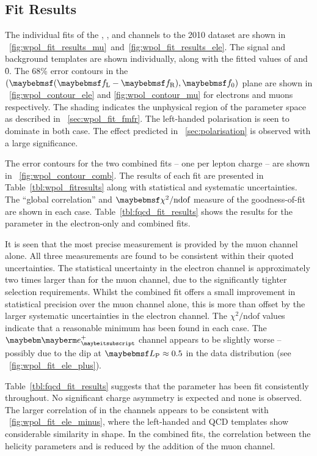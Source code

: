 \subsection{Fit Results}
The individual fits of the \Pgmp, \Pgmm, \Pep and \Pem channels to the 2010
dataset are shown in
\figs~\ref{fig:wpol_fit_results_mu}~and~\ref{fig:wpol_fit_results_ele}. The
signal and background templates are shown individually, along with the fitted
values of \fLmfR and \f0. The 68\% error contours in the $(\fLmfR, \f0)$ plane
are shown in \figs~\ref{fig:wpol_contour_ele} and \ref{fig:wpol_contour_mu} for
electrons and muons respectively. The shading indicates the unphysical region of
the parameter space as described in \sec~\ref{sec:wpol_fit_fmfr}. The
left-handed polarisation is seen to dominate in both case. The effect predicted
in \sec~\ref{sec:polarisation} is observed with a large significance.

The error contours for the two combined fits -- one per lepton charge -- are
shown in \fig~\ref{fig:wpol_contour_comb}. The results of each fit are presented
in Table~\ref{tbl:wpol_fitresults} along with statistical and systematic
uncertainties. The ``global correlation'' and $\chisq/\textrm{ndof}$ measure of
the goodness-of-fit are shown in each case. Table~\ref{tbl:fqcd_fit_results}
shows the results for the parameter \fQCD in the electron-only and combined
fits.

It is seen that the most precise measurement is provided by the muon channel
alone. All three measurements are found to be consistent within their quoted
uncertainties. The statistical uncertainty in the electron channel is
approximately two times larger than for the muon channel, due to the
significantly tighter selection requirements. Whilst the combined fit offers a
small improvement in statistical precision over the muon channel alone, this is
more than offset by the larger systematic uncertainties in the electron
channel. The $\chi^2/\textrm{ndof}$ values indicate that a reasonable minimum
has been found in each case. The $\Pep$ channel appears to be slightly worse --
possibly due to the dip at $\LP \approx 0.5$ in the data distribution (see
\fig~\ref{fig:wpol_fit_ele_plus}).

Table~\ref{tbl:fqcd_fit_results} suggests that the parameter \fQCD has been fit
consistently throughout. No significant charge asymmetry is expected and none is
observed. The larger correlation of \fLmfR in the \PWm channels appears to be
consistent with \fig~\ref{fig:wpol_fit_ele_minus}, where the left-handed and
\ac{QCD} templates show considerable similarity in shape. In the combined fits,
the correlation between the helicity parameters and \fQCD is reduced by the
addition of the muon channel.

